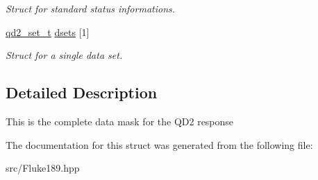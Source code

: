 \begin{DoxyCompactItemize}
\begin{DoxyCompactList}\small\item\em Struct for standard status informations. \item\end{DoxyCompactList}\item 
\hypertarget{structFluke_1_1Fluke189_1_1cmdr__QD2__t_ad097cbf0f6307f10a189d76512ead34e}{
\hyperlink{structFluke_1_1Fluke189_1_1qd2__set__t}{qd2\_\-set\_\-t} \hyperlink{structFluke_1_1Fluke189_1_1cmdr__QD2__t_ad097cbf0f6307f10a189d76512ead34e}{dsets} \mbox{[}1\mbox{]}}
\label{structFluke_1_1Fluke189_1_1cmdr__QD2__t_ad097cbf0f6307f10a189d76512ead34e}

\begin{DoxyCompactList}\small\item\em Struct for a single data set. \item\end{DoxyCompactList}\end{DoxyCompactItemize}


\subsection{Detailed Description}
This is the complete data mask for the QD2 response 

The documentation for this struct was generated from the following file:\begin{DoxyCompactItemize}
\item 
src/Fluke189.hpp\end{DoxyCompactItemize}
